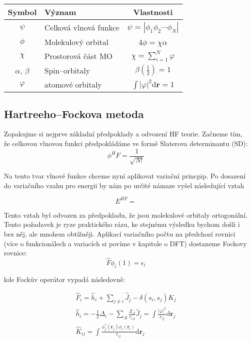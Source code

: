 \begin{tabular}{|c|l|c|}
\hline 
\rule[-1ex]{0pt}{2.5ex} Symbol & 	Význam	& Vlastnosti \\ 
\hline 
\rule[-1ex]{0pt}{2.5ex} $\psi$ & Celková vlnová funkce  & $\psi$ = $|\phi_1 \phi_2 \cdots \phi_N |$ \\ 
\hline 
\rule[-1ex]{0pt}{2.5ex} $\phi$ & Molekulový orbital & 4$\phi=\chi \alpha $\\ 
\hline 
\rule[-1ex]{0pt}{2.5ex} $\chi$ & Prostorová část MO & $\chi=\sum_{i=1}^N \varphi $ \\ 
\hline 
\rule[-1ex]{0pt}{2.5ex} $\alpha$, $\beta$  & Spin--orbitaly & $\beta(\frac{1}{2})=1$ \\ 
\hline 
\rule[-1ex]{0pt}{2.5ex} $\varphi$ & atomové orbitaly & $\int |\varphi|^2 \mathrm{d}\textbf{r} = 1 $ \\
\hline
\end{tabular} 

\subsection{Hartreeho--Fockova metoda}

Zopakujme si nejprve základní předpoklady a odvození HF teorie. Začneme tím, že celkovou vlnovou funkci předpokládáme ve formě Slaterova determinantu (SD):
\begin{equation}
\phi^HF=\frac{1}{\sqrt{N!}}
\end{equation}


Na tento tvar vlnové funkce chceme nyní aplikovat variační princpip. Po dosazení do variačního vzahu pro energii by nám po určité námaze vyšel následující vztah

\begin{equation}
E^{HF}=
\end{equation}

Tento vztah byl odvozen za předpokladu, že jsou molekulové orbitaly ortogonální. Tento požadavek je ryze praktického rázu, ke stejnému výsledku bychom došli i bez něj, ale mnohem obtížněji. Aplikací variačního počtu na předchozí rovnici (více o funkcionálech a variacích si povíme v kapitole o DFT) dostaneme Fockovy rovnice:
\begin{equation}
\hat{F}\phi_i(1) = \epsilon_i  
\end{equation}

kde Fockův operátor  vypadá následovně:

\begin{eqnarray}
\hat{F}_i = \hat{h}_i+\sum_{j\neq i} \hat{J}_j - \delta(s_i,s_j) \hat{K}_j \\
\hat{h}_i = -\frac{1}{2}\Delta_i - \sum_{A}\frac{Z_A}{r_{iA}}
\hat{J}_j=\int \frac{|\varphi |^2}{r_{ij}}\mathrm{d}\textbf{r}_j \\
\hat{K}_{ij} = \int \frac{\phi_j^*(\mathbf{r}_j)\phi_i(\mathbf{r}_i)}{r_{ij}}\mathrm{d}\textbf{r}_j
\end{eqnarray}

